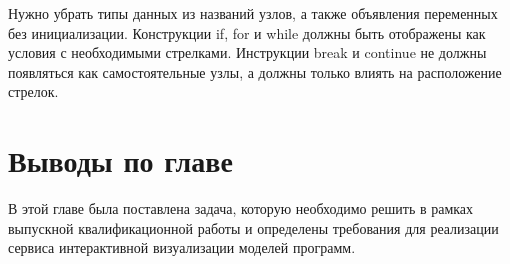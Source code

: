 Нужно убрать типы данных из названий узлов, а также объявления переменных без инициализации. Конструкции if, for и while должны быть отображены как условия с необходимыми стрелками. Инструкции break и continue не должны появляться как самостоятельные узлы, а должны только влиять на расположение стрелок.
\section{Выводы по главе} \label{ch3:sec3}
В этой главе была поставлена задача, которую необходимо решить в рамках выпускной квалификационной работы и определены требования для реализации сервиса интерактивной визуализации моделей программ.
\newpage